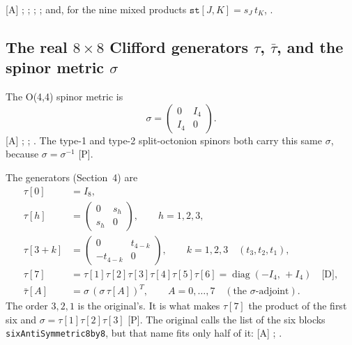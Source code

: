 [A] ; ;
; ; and, for the
nine mixed products $\texttt{st}[J,K]=s_J\,t_K$, .

\subsection{The real \texorpdfstring{$8\times8$}{8x8} Clifford generators \texorpdfstring{$\tau$, $\bar\tau$}{tau, taubar}, and the spinor metric \texorpdfstring{$\sigma$}{sigma}}
\label{fnd:tau}\label{sec:2.4}

The O(4,4) spinor metric is
\begin{equation}
  \sigma = \begin{pmatrix} 0 & I_4\\ I_4 & 0\end{pmatrix}.
\end{equation}
[A] ; ; . The
type-1 and type-2 split-octonion spinors both carry this same $\sigma$, because
$\sigma=\sigma^{-1}$ [P].

The generators (Section~4) are
\begin{align}
  \tau[0] &= I_8, \\
  \tau[h] &= \begin{pmatrix} 0 & s_h\\ s_h & 0\end{pmatrix}, \qquad h=1,2,3,\\
  \tau[3+k] &= \begin{pmatrix} 0 & t_{4-k}\\ -t_{4-k} & 0\end{pmatrix}, \qquad k=1,2,3\quad(t_3,t_2,t_1),\\
  \tau[7] &= \tau[1]\tau[2]\tau[3]\tau[4]\tau[5]\tau[6] = \operatorname{diag}(-I_4,\,+I_4)\quad\text{[D]},\\
  \bar\tau[A] &= \sigma\,(\sigma\,\tau[A])^{T},\qquad A=0,\dots,7\quad(\text{the $\sigma$-adjoint}).
\end{align}
The order $3,2,1$ is the original's. It is what makes $\tau[7]$ the product of the first six and
$\sigma=\tau[1]\tau[2]\tau[3]$ [P]. The original calls the list of the six blocks
\texttt{sixAntiSymmetric8by8}, but that name fits only half of it: [A]
;
.

